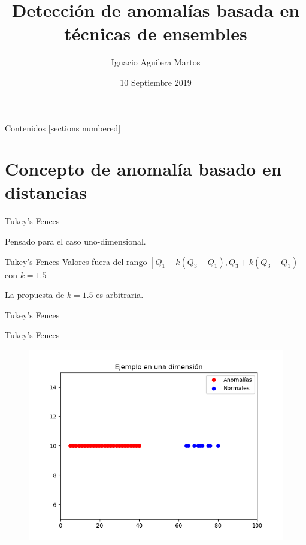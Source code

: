 \documentclass[10pt]{beamer}
\title{Detección de anomalías basada en técnicas de ensembles}
\author{Ignacio Aguilera Martos}
\date{10 Septiembre 2019}
\institute{Trabajo Fin de Grado \\ \href{https://github.com/nacheteam/Ensemble-Outlier-Analysis}{Código disponible en GitHub}}
\begin{document}
\maketitle

\begin{frame}[fragile]{Contenidos}
  [sections numbered]
  \tableofcontents[hideallsubsections]
\end{frame}

\section{Concepto de anomalía basado en distancias}

\begin{frame}[fragile]{Tukey's Fences}
\vspace{10px}
\pause
{}

Pensado para el caso uno-dimensional.

\pause

\begin{block}{Tukey's Fences}
	Valores fuera del rango $[Q_1 - k(Q_3 - Q_1), Q_3 + k(Q_3 - Q_1)]$ con $k=1.5$
\end{block}

\pause

La propuesta de $k=1.5$ es arbitraria.

\end{frame}

\begin{frame}[fragile]{Tukey's Fences}
\vspace{10px}
\centering
{}

\end{frame}

\begin{frame}[fragile]{Tukey's Fences}
\vspace{10px}

\begin{figure}
	\centering
	\includegraphics[scale=0.6]{Imagenes/outlier-1d.png}
\end{figure}

\end{frame}
\end{document}
